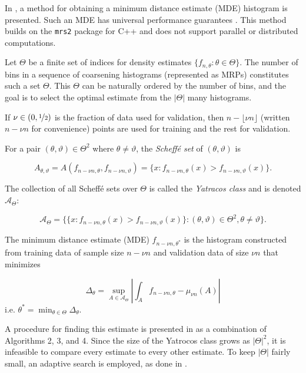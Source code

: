 \documentclass[../scalable-hists.tex]{subfiles}
\begin{document}
  In \cite{srp-mde-raaz-teng}, a method for obtaining a
  minimum distance estimate (MDE) histogram is presented.
  Such an MDE has universal performance guarantees \cite{devroye-lugosi}.
  This method builds on the \verb|mrs2| package for C++ \cite{mrs2} and
  does not support parallel or distributed computations.

  Let $\Theta$ be a finite set of indices for density estimates $\{ f_{n,\theta} : \theta \in \Theta \}$.
  The number of bins in a sequence of coarsening histograms (represented as MRPs) 
  constitutes such a set $\Theta$.
  This $\Theta$ can be naturally ordered by the number of bins,
  and the goal is to select the optimal estimate from the $|\Theta|$ many histograms.

  If $\nu \in (0, \nicefrac{1}{2})$ is the fraction of data used for validation,
  then $n - \lfloor \nu n \rfloor$ (written $n - \nu n$ for convenience)
  points are used for training and the rest for validation.

  For a pair $(\theta, \vartheta) \in \Theta^2$ where $\theta \neq \vartheta$,
  the \textit{Scheffé set} of $(\theta, \vartheta)$ is

  \[ 
    A_{\theta, \vartheta} = 
    A(f_{n - \nu n, \theta}, f_{n - \nu n, \vartheta}) = 
    \{ x : f_{n - \nu n, \theta}(x) > f_{n - \nu n, \vartheta}(x) \}.
  \]

  The collection of all Scheffé sets over $\Theta$ is called the \textit{Yatracos class} and is denoted $\mathcal{A}_\Theta$:

  \[
    \mathcal{A}_\Theta =
    \{
      \{ x : f_{n - \nu n, \theta}(x) > f_{n - \nu n, \vartheta}(x) \} :
      (\theta, \vartheta) \in \Theta^2, \theta \neq \vartheta
    \}. 
  \]

  The minimum distance estimate (MDE) $f_{n - \nu n, \theta^*}$ is
  the histogram constructed from training data of sample size $n - \nu n$ 
  and validation data of size $\nu n$ that minimizes

  \[
    \Delta_\theta = 
    \sup_{A \in \mathcal{A}_\Theta} \left| 
      \int_A f_{n - \nu n, \theta} - \mu_{\nu n}( A ) 
    \right|  
  \]
  i.e. $\theta^* = \min_{\theta \in \Theta} \Delta_\theta$.

  A procedure for finding this estimate is presented in
  \cite{srp-mde-raaz-teng} as a combination of Algorithms 2, 3, and 4.
  Since the size of the Yatrocos class grows as $|\Theta|^2$,
  it is infeasible to compare every estimate to every other estimate.
  To keep $|\Theta|$ fairly small, an adaptive search is employed, as done in \cite{srp-mde-raaz-teng}.
\end{document}
